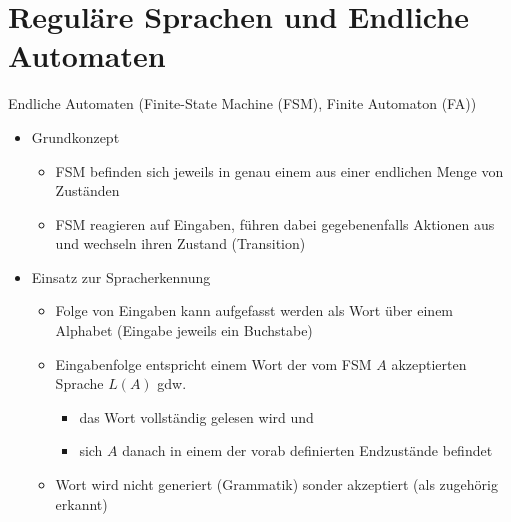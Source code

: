 \section{Reguläre Sprachen und Endliche Automaten}


\begin{frame}{Endliche Automaten (Finite-State Machine (FSM), Finite Automaton (FA))}
	\begin{itemize}
		\item Grundkonzept
		\begin{itemize}
			\item FSM befinden sich jeweils in genau einem aus einer endlichen Menge von Zuständen
			\item FSM reagieren auf Eingaben, führen dabei gegebenenfalls Aktionen aus und wechseln ihren Zustand (Transition)
		\end{itemize}
		\item Einsatz zur Spracherkennung
		\begin{itemize}
			\item Folge von Eingaben kann aufgefasst werden als Wort über einem Alphabet (Eingabe jeweils ein Buchstabe)
			\item Eingabenfolge entspricht einem Wort der vom FSM $A$ akzeptierten Sprache $L(A)$ gdw.
			\begin{itemize}
				\item das Wort vollständig gelesen wird und
				\item sich $A$ danach in einem der vorab definierten Endzustände befindet
			\end{itemize}
			\item Wort wird nicht generiert (Grammatik) sonder akzeptiert (als zugehörig erkannt)
		\end{itemize}
	\end{itemize}
\end{frame}

